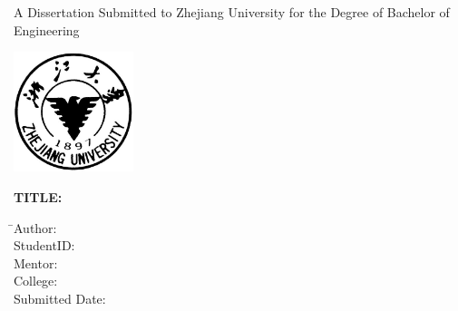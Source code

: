 
\newpage
\thispagestyle{empty}

\vspace{5mm}

\begin{center}
    \songti\xiaoyi A Dissertation Submitted to Zhejiang University for the Degree of Bachelor of Engineering
\end{center}

\vspace{4mm}

\begin{center}
  \includegraphics[width=35mm]{images/standxb}
\end{center}

\vspace{25mm}

{\hspace{3mm}\songti\sanhao\bfseries TITLE:\hspace{4mm}\begin{minipage}[t]{124mm}\end{minipage}}

\vspace{7mm}

\begin{tabbing}
    \hspace{18mm} \= \sanhao Author:\hspace{19mm} \= \underline{\makebox[8cm]{\sanhao\zjuauthornamee\hspace{3mm}\zjuauthorid}} \\[2mm]
    \> \sanhao StudentID:\hspace{19mm} \> \underline{\makebox[8cm]{\sanhao\zjuauthornamee\hspace{3mm}\zjuauthorid}} \\[2mm]
    \> \sanhao Mentor:\hspace{19mm} \> \underline{\makebox[8cm]{\sanhao\zjuauthornamee\hspace{3mm}\zjuauthorid}} \\[2mm]
                  \> \sanhao College: \> \underline{\makebox[8cm]{\sanhao\zjucollegee}} \\[2mm]
                  \> \sanhao Submitted Date: \> \underline{\makebox[8cm]{\sanhao\zjusubmitteddatee}}
\end{tabbing}

